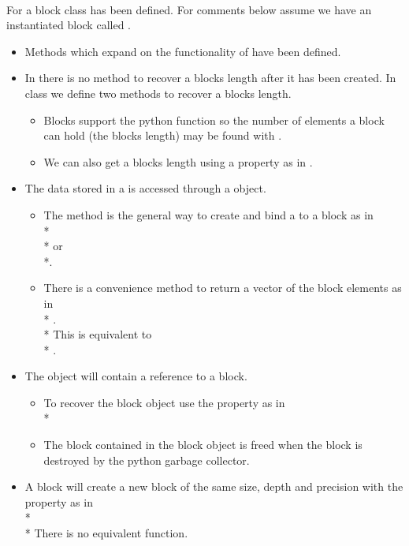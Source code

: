 \pyjvsiph
\\\hspace*{1cm}\parbox{.9\textwidth}{For \pyjv{} a block class has been defined. For comments below assume we have an instantiated block called .}
\begin{itemize}[leftmargin=1.35cm]
\item Methods which expand on the functionality of {\cvl{}} have been defined.
\item In \cvl{} there is no method to recover a blocks length after it has been created. In \pyjv{}  class we define two methods to recover a blocks length.
    \begin{itemize}
    \item{Blocks support the  python function so the number of elements a block can hold (the blocks length) may be found with .}
    \item{We can also get a blocks length using a property as in .}
     \end{itemize}
\item The data stored in a  is accessed through a  object.
    \begin{itemize}
    \item The  method is the general way to create and bind a  to a block as in\\* \\* or \\*.
    \item There is a convenience method to return a vector  of the block elements as in\\* .\\* This is equivalent to\\* .
    \end{itemize}
%
\item The  object will contain a reference to a \cvl{} block.
    \begin{itemize} 
    \item To recover the \cvl{} block object use the  property as in \\*
    \item The \cvl{} block contained in the \pyjv{} block object is freed when the \pyjv{} block is destroyed by the python garbage collector.
    \end{itemize}
\item A block will create a new block of the same size, depth and precision with the  property as in\\*
\\*
There is no equivalent \cvl{} function.
\end{itemize}
